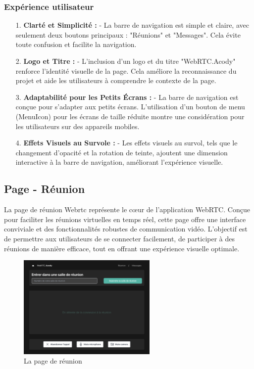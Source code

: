 \documentclass[12pt, a4paper, oneside]{article}
\begin{document}
\subsubsection{Expérience utilisateur}
\begin{enumerate}
    \item[1.] \textbf{Clarté et Simplicité :}
    - La barre de navigation est simple et claire, avec seulement deux boutons principaux : "Réunions" et "Messages". Cela évite toute confusion et facilite la navigation.

    \item[2.] \textbf{Logo et Titre :}
    - L'inclusion d'un logo et du titre "WebRTC.Acody" renforce l'identité visuelle de la page. Cela améliore la reconnaissance du projet et aide les utilisateurs à comprendre le contexte de la page.
  
    \item[3.] \textbf{Adaptabilité pour les Petits Écrans :}
    - La barre de navigation est conçue pour s'adapter aux petits écrans. L'utilisation d'un bouton de menu (MenuIcon) pour les écrans de taille réduite montre une considération pour les utilisateurs sur des appareils mobiles.

    \item[4.] \textbf{Effets Visuels au Survole :}
    - Les effets visuels au survol, tels que le changement d'opacité et la rotation de teinte, ajoutent une dimension interactive à la barre de navigation, améliorant l'expérience visuelle.

\end{enumerate}
\newpage
\subsection{Page - Réunion}

La page de réunion Webrtc représente le cœur de l'application WebRTC. Conçue pour faciliter les réunions virtuelles en temps réel, cette page offre une interface conviviale et des fonctionnalités robustes de communication vidéo. L'objectif est de permettre aux utilisateurs de se connecter facilement, de participer à des réunions de manière efficace, tout en offrant une expérience visuelle optimale. 

\begin{figure}[h]
  \centering
  \includegraphics[width=0.6\textwidth]{images/ReunionPres.png}
  \caption{La page de réunion}
\end{figure}
\end{document}
